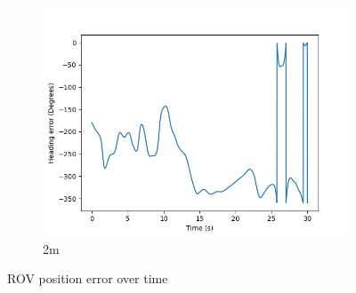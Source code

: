 \documentclass[class=article, crop=false]{standalone}
\begin{document}
\begin{figure}
\begin{subfigure}[b]{0.48\textwidth}
        \centering
        \includegraphics{scenario1/rov-0m/2.0m/usv_heading_error_controlled}
        \caption{2m}
        \label{}
    \end{subfigure}

    \caption{ROV position error over time}
\end{figure}
\end{document}
